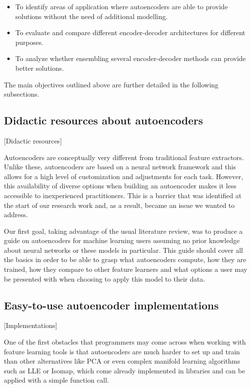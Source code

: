 \begin{itemize}
    \item To identify areas of application where autoencoders are able to provide solutions without the need of additional modelling.
    \item To evaluate and compare different encoder-decoder architectures for different purposes.
    \item To analyze whether ensembling several encoder-decoder methods can provide better solutions.
\end{itemize}

The main objectives outlined above are further detailed in the following subsections.

\subsection{Didactic resources about autoencoders}[Didactic resources]\label{ss:didactic}

Autoencoders are conceptually very different from traditional feature extractors. Unlike these, autoencoders are based on a neural network framework and this allows for a high level of customization and adjustments for each task. However, this availability of diverse options when building an autoencoder makes it less accessible to inexperienced practitioners. This is a barrier that was identified at the start of our research work and, as a result, became an issue we wanted to address.

Our first goal, taking advantage of the usual literature review, was to produce a guide on autoencoders for machine learning users assuming no prior knowledge about neural networks or these models in particular. This guide should cover all the basics in order to be able to grasp what autoencoders compute, how they are trained, how they compare to other feature learners and what options a user may be presented with when choosing to apply this model to their data.


\subsection{Easy-to-use autoencoder implementations}[Implementations]\label{ss:implementations}

One of the first obstacles that programmers may come across when working with feature learning tools is that autoencoders are much harder to set up and train than other alternatives like PCA or even complex manifold learning algorithms such as LLE or Isomap, which come already implemented in libraries and can be applied with a simple function call.

